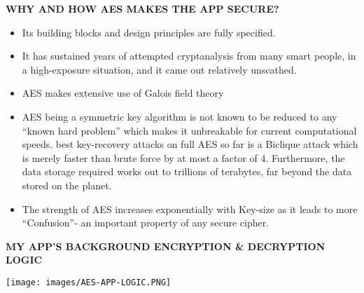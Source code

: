 \documentclass{beamer}
\begin{document}
\begin{frame}
\begin{tcolorbox}
\begin{center}
\textsc{\textbf{\textcolor{byzantium}{WHY AND HOW AES MAKES THE APP SECURE?}}}
\end{center} 
\end{tcolorbox}
\begin{flushleft}
\begin{itemize}
\item Its building blocks and design principles are fully specified.
\item It has sustained years of attempted cryptanalysis from many smart people, in a high-exposure situation, and it came out relatively unscathed.
\item AES makes extensive use of Galois field theory
\item AES being a symmetric key algorithm is not known to be reduced to any “known hard problem” which makes it unbreakable for current computational speeds.
\itemThe best key-recovery attacks on full AES so far is a Biclique attack which is merely faster than brute force by at most a factor of 4. Furthermore, the data storage required works out to trillions of terabytes, far beyond the data stored on the planet.
\item The strength of AES increases exponentially with Key-size as it leads to more “Confusion”- an important property of any secure cipher.
\end{itemize}
\end{flushleft}
\end{frame}

\begin{frame}[plain]
\begin{tcolorbox}
\begin{center}
\textsc{\textbf{\textcolor{byzantium}{MY APP'S BACKGROUND ENCRYPTION \& DECRYPTION LOGIC}}}
\end{center} 
\end{tcolorbox}
\begin{center}
\texttt{[image: images/AES-APP-LOGIC.PNG]}
\end{center}
\end{frame}
\end{document}
